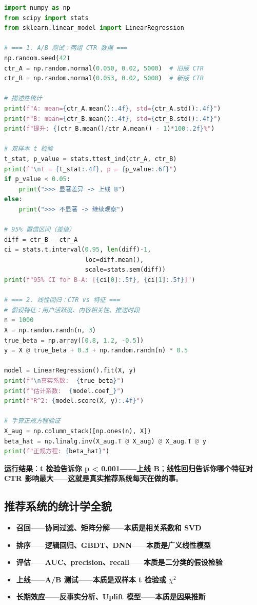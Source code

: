 \begin{lstlisting}[language=Python, caption={A/B 测试 + 线性回归}]
import numpy as np
from scipy import stats
from sklearn.linear_model import LinearRegression

# === 1. A/B 测试：两组 CTR 数据 ===
np.random.seed(42)
ctr_A = np.random.normal(0.050, 0.02, 5000)  # 旧版 CTR
ctr_B = np.random.normal(0.053, 0.02, 5000)  # 新版 CTR

# 描述性统计
print(f"A: mean={ctr_A.mean():.4f}, std={ctr_A.std():.4f}")
print(f"B: mean={ctr_B.mean():.4f}, std={ctr_B.std():.4f}")
print(f"提升: {(ctr_B.mean()/ctr_A.mean() - 1)*100:.2f}%")

# 双样本 t 检验
t_stat, p_value = stats.ttest_ind(ctr_A, ctr_B)
print(f"\nt = {t_stat:.4f}, p = {p_value:.6f}")
if p_value < 0.05:
    print(">>> 显著差异 -> 上线 B")
else:
    print(">>> 不显著 -> 继续观察")

# 95% 置信区间（差值）
diff = ctr_B - ctr_A
ci = stats.t.interval(0.95, len(diff)-1,
                      loc=diff.mean(),
                      scale=stats.sem(diff))
print(f"95% CI for B-A: [{ci[0]:.5f}, {ci[1]:.5f}]")

# === 2. 线性回归：CTR vs 特征 ===
# 假设特征：用户活跃度、内容相关性、推送时段
n = 1000
X = np.random.randn(n, 3)
true_beta = np.array([0.8, 1.2, -0.5])
y = X @ true_beta + 0.3 + np.random.randn(n) * 0.5

model = LinearRegression().fit(X, y)
print(f"\n真实系数:  {true_beta}")
print(f"估计系数:  {model.coef_}")
print(f"R^2: {model.score(X, y):.4f}")

# 手算正规方程验证
X_aug = np.column_stack([np.ones(n), X])
beta_hat = np.linalg.inv(X_aug.T @ X_aug) @ X_aug.T @ y
print(f"正规方程: {beta_hat}")
\end{lstlisting}

\textbf{运行结果}：\textbf{t 检验告诉你 p < 0.001——上线 B}；\textbf{线性回归告诉你哪个特征对 CTR 影响最大}——\textbf{这就是真实推荐系统每天在做的事}。

\subsection{推荐系统的统计学全貌}

\begin{itemize}
\item \textbf{召回}——\textbf{协同过滤、矩阵分解}——\textbf{本质是\textbf{相关系数}和 \textbf{SVD}}
\item \textbf{排序}——\textbf{逻辑回归、GBDT、DNN}——\textbf{本质是\textbf{广义线性模型}}
\item \textbf{评估}——\textbf{AUC、precision、recall}——\textbf{本质是\textbf{二分类的假设检验}}
\item \textbf{上线}——\textbf{A/B 测试}——\textbf{本质是\textbf{双样本 t 检验或 $\chi^2$}}
\item \textbf{长期效应}——\textbf{反事实分析、Uplift 模型}——\textbf{本质是\textbf{因果推断}}
\end{itemize}

